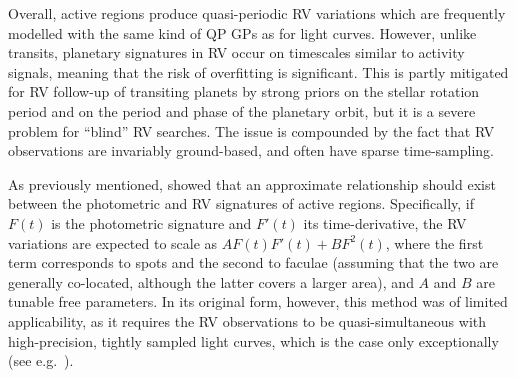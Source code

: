 \documentclass[letterpaper]{ar-1col}
\begin{document}
Overall, active regions produce quasi-periodic RV variations which are frequently modelled with the same kind of QP GPs as for light curves. However, unlike transits, planetary signatures in RV occur on timescales similar to activity signals, meaning that the risk of overfitting is significant. This is partly mitigated for RV follow-up of transiting planets by strong priors on the stellar rotation period and on the period and phase of the planetary orbit, but it is a severe problem for ``blind'' RV searches. The issue is compounded by the fact that RV observations are invariably ground-based, and often have sparse time-sampling.

As previously mentioned, \citet{2012MNRAS.419.3147A} showed that an approximate relationship should exist between the photometric and RV signatures of active regions. Specifically, if $F(t)$ is the photometric signature and $F'(t)$ its time-derivative, the RV variations are expected to scale as $A F(t) F'(t) + B F^2(t)$, where the first term corresponds to spots and the second to faculae (assuming that the two are generally co-located, although the latter covers a larger area), and $A$ and $B$ are tunable free parameters. In its original form, however, this method was of limited applicability, as it requires the RV observations to be quasi-simultaneous with high-precision, tightly sampled light curves, which is the case only exceptionally (see e.g.\ \citealt{2014MNRAS.443.2517H}).
\end{document}

